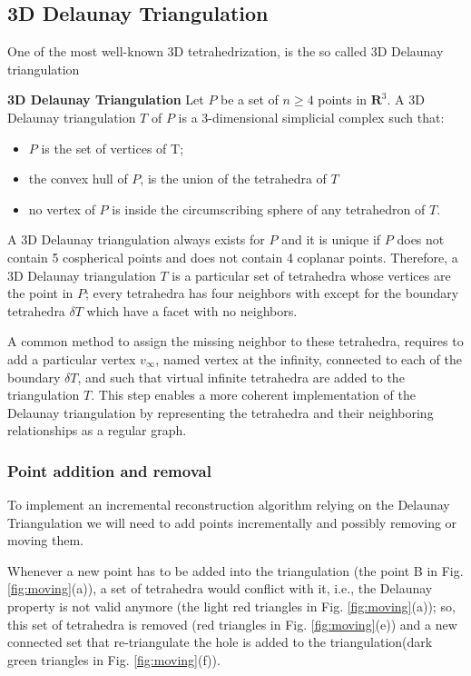 \subsection{3D Delaunay Triangulation}
One of the most well-known 3D tetrahedrization, is the so called 3D Delaunay triangulation

\begin{mydef}
 \textbf{3D Delaunay Triangulation}
 Let $\mathit{P}$ be a set of $n \geq 4$ points in $\mathbf{R}^3$. A 3D Delaunay triangulation $T$ of $\mathit{P}$ is a 3-dimensional simplicial complex such that:
 \begin{itemize}
  \item $\mathit{P}$ is the set of vertices of T;
  \item the convex hull of $\mathit{P}$, is the union of the tetrahedra of $T$
  \item no vertex of $\mathit{P}$ is inside the circumscribing sphere of any tetrahedron of $T$.
 \end{itemize}

 
\end{mydef}

A 3D Delaunay triangulation always exists for $\mathit{P}$ and it is unique if  $\mathit{P}$ does not contain 5 cospherical points and does not contain 4 coplanar points.
Therefore, a 3D Delaunay triangulation $T$ is a particular set of tetrahedra whose vertices are the point in $\mathit{P}$; every tetrahedra has four neighbors with except for the boundary tetrahedra $\delta T$ which have a facet with no neighbors. 

A common method to assign the missing neighbor to these tetrahedra, requires to add a particular vertex $v_\infty$, named vertex at the infinity, connected to each of the boundary $\delta T$, and such that virtual infinite tetrahedra are added to the triangulation $T$. 
This step enables a more coherent implementation of the Delaunay triangulation by representing the tetrahedra and their neighboring relationships as a regular graph.

\subsubsection{Point addition and removal}
To implement an incremental reconstruction algorithm relying on the Delaunay Triangulation we will need to add points incrementally and possibly removing or moving them.

Whenever a new point has to be added into the triangulation  (the point B in Fig. \ref{fig:moving}(a)), a set of tetrahedra would conflict with it, i.e., the Delaunay property is not valid anymore (the light red triangles in Fig. \ref{fig:moving}(a)); so, this set of tetrahedra  is removed  (red triangles in Fig. \ref{fig:moving}(e)) and a new connected set that re-triangulate the hole is added to the triangulation(dark green triangles in Fig. \ref{fig:moving}(f)).

